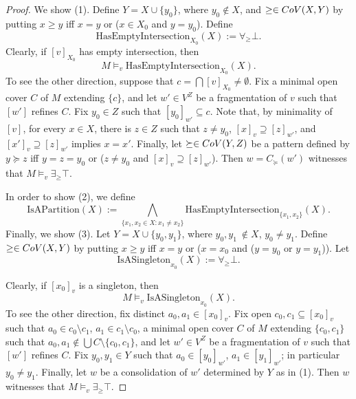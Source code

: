 \documentclass[10pt,a4paper]{amsart}
\newcommand \Val{{\rm{CoV}}}
\newcommand \rng{{\rm{ rng}}}
\begin{document}
\begin{proof}
	
	We show (1). Define $Y=X \cup \{y_0\}$, where $y_0 \not \in X$, and $\geq \in \Val(X,Y)$ by putting $x \geq y$ iff $x=y$ or ($x \in X_0$ and $y=y_0$). Define
	\[ \text{HasEmptyIntersection}_{X_0}(X):= \forall_{\geq} \bot.\]
	Clearly, if $[v]_{X_0}$ has empty intersection, then $$M \models_v \text{HasEmptyIntersection}_{X_0}(X).$$ To see the other direction, suppose that $c=\bigcap [v]_{X_0 } \neq \emptyset$. Fix a minimal open cover $C$ of $M$ extending $\{c\}$,  and  let $w' \in V^Z$ be a fragmentation of $v$ such that $[w']$ refines $C$. Fix $y_0 \in Z$ such that $[y_0]_{w'} \subseteq c$. Note that, by minimality of $[v] $, for every $x \in X$, there is $z \in Z$ such that $z \neq y_0$, $[x]_v \supseteq [z]_{w'}$, and $[x']_v \supseteq [z]_{w'}$ implies $x=x'$.  Finally, let $\succeq \in \Val(Y,Z)$ be a pattern defined by $y \succeq z$ iff $y=z=y_0$ or ($z \neq y_0$ and  $[x]_v \supseteq [z]_{w'}$). Then $w=C_\succeq (w')$ witnesses that $M  \models_v   \exists_{\geq} \top$.
	
	
	
	In order to show (2), we define 
	\[\text{IsAPartition}(X):= \bigwedge_{\{x_1,x_2 \in X: x_1 \neq x_2\}} \text{HasEmptyIntersection}_{\{x_1,x_2\}}(X).\]
	Finally, we show (3). Let $Y=X \cup \{y_0,y_1\}$, where $y_0,y_1\ \not \in X$, $y_0 \neq y_1$.  Define $\geq \in \Val(X,Y)$ by putting $x \geq y$ iff $x=y$ or ($x=x_0$ and  ($y=y_0$ or $y=y_1$)). Let
	\[\text{IsASingleton}_{x_0}(X):=\forall_{\geq} \bot .\]
	
	Clearly, if $[x_0]_v$ is a singleton, then $$M \models_v \text{IsASingleton}_{x_0}(X).$$ To see the other direction, fix distinct $a_0, a_1 \in [x_0]_v$. Fix open $c_0, c_1 \subseteq [x_0]_v$ such that $a_0 \in c_0 \setminus c_1$, $a_1 \in c_1 \setminus c_0$,  a minimal open cover $C$ of $M$ extending $\{c_0, c_1\}$ such that $a_0, a_1 \not \in \bigcup C \setminus \{c_0,c_1\}$,  and  let $w' \in V^Z$ be a fragmentation of $v$ such that $[w']$ refines $C$. Fix $y_0, y_1 \in Y$  such that $a_0 \in [y_0]_{w'}$, $a_1 \in [y_1]_{w'}$; in particular $y_0 \neq y_1$.  Finally, let $w$ be a consolidation of $w'$ determined by $Y$ as in (1). Then $w$ witnesses that $M  \models_v   \exists_{\geq} \top$.
\end{proof}
\end{document}
